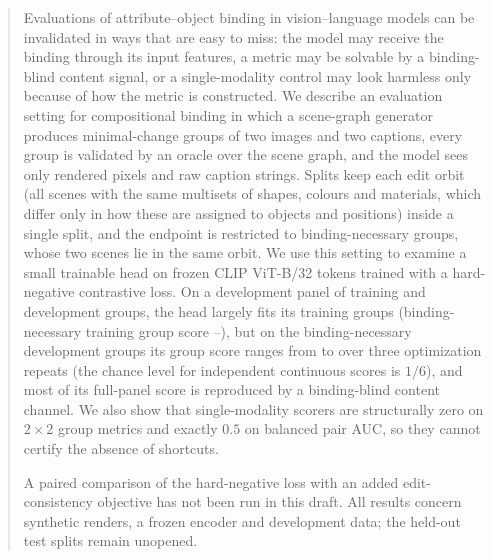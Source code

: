 \begin{abstract}
Evaluations of attribute--object binding in vision--language models can be invalidated in ways
that are easy to miss: the model may receive the binding through its input features, a metric may
be solvable by a binding-blind content signal, or a single-modality control may look harmless only
because of how the metric is constructed. We describe an evaluation setting for compositional
binding in which a scene-graph generator produces minimal-change groups of two images and two
captions, every group is validated by an oracle over the scene graph, and the model sees only
rendered pixels and raw caption strings. Splits keep each edit orbit (all scenes with the same
multisets of shapes, colours and materials, which differ only in how these are assigned to objects
and positions) inside a single split, and the endpoint is restricted to binding-necessary groups, whose two scenes lie in
the same orbit. We use this setting to examine a small trainable head on frozen CLIP ViT-B/32
tokens trained with a hard-negative contrastive loss. On a development panel of \SPtrainGroups{}
training and \SPdevGroups{} development groups, the head largely fits its training groups
(binding-necessary training group score \SPtrainBNGroupMin--\SPtrainBNGroupMax), but on the
\SPdevBNn{} binding-necessary development groups its group score ranges from \SPdevBNGroupMin{} to
\SPdevBNGroupMax{} over three optimization repeats (the chance level for independent continuous
scores is $1/6$), and most of its full-panel score is reproduced by a binding-blind content channel.
We also show that single-modality scorers are structurally zero on $2{\times}2$ group metrics and
exactly $0.5$ on balanced pair AUC, so they cannot certify the absence of shortcuts.
\ifhavepaired

\else
A paired comparison of the hard-negative loss with an added edit-consistency objective has not been
run in this draft.
\fi
All results concern synthetic renders, a frozen encoder and development data; the held-out test
splits remain unopened.
\end{abstract}

